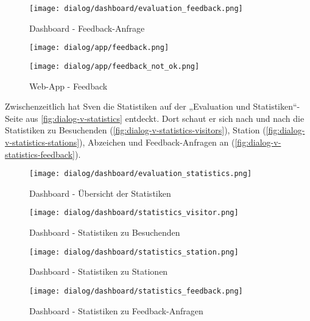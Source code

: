 \begin{figure}[hp]
    \centering
    \texttt{[image: dialog/dashboard/evaluation\_feedback.png]}
    \caption{Dashboard - Feedback-Anfrage}
    \label{fig:dialog-v-feedback}
\end{figure}

\begin{figure}[hp]
    \centering
    \begin{minipage}{.5\textwidth}
        \centering
        \texttt{[image: dialog/app/feedback.png]}
    \end{minipage}%
    \begin{minipage}{.5\textwidth}
        \centering
        \texttt{[image: dialog/app/feedback\_not\_ok.png]}
    \end{minipage}
    \caption{Web-App - Feedback}
    \label{fig:dialog-t-feedback}
\end{figure}

\newpage

Zwischenzeitlich hat Sven die Statistiken auf der „Evaluation und
Statistiken“-Seite aus \autoref{fig:dialog-v-statistics} entdeckt. Dort schaut
er sich nach und nach die Statistiken zu Besuchenden (\autoref{fig:dialog-v-statistics-visitors}), Station (\autoref{fig:dialog-v-statistics-stations}), Abzeichen und Feedback-Anfragen an
(\autoref{fig:dialog-v-statistics-feedback}).

\begin{figure}[hp]
    \centering
    \texttt{[image: dialog/dashboard/evaluation\_statistics.png]}
    \caption{Dashboard - Übersicht der Statistiken}
    \label{fig:dialog-v-statistics}
\end{figure}

\begin{figure}[hp]
    \centering
    \texttt{[image: dialog/dashboard/statistics\_visitor.png]}
    \caption{Dashboard - Statistiken zu Besuchenden}
    \label{fig:dialog-v-statistics-visitors}
\end{figure}

\begin{figure}[hp]
    \centering
    \texttt{[image: dialog/dashboard/statistics\_station.png]}
    \caption{Dashboard - Statistiken zu Stationen}
    \label{fig:dialog-v-statistics-stations}
\end{figure}

\begin{figure}[hp]
    \centering
    \texttt{[image: dialog/dashboard/statistics\_feedback.png]}
    \caption{Dashboard - Statistiken zu Feedback-Anfragen}
    \label{fig:dialog-v-statistics-feedback}
\end{figure}